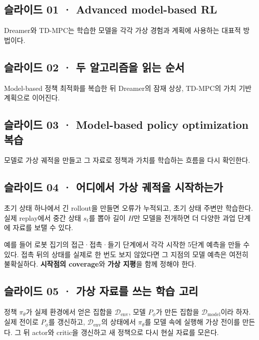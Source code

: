 \documentclass[11pt,a4paper]{article}
\begin{document}
\subsection{슬라이드 01 · Advanced model-based RL}

Dreamer와 TD-MPC는 학습한 모델을 각각 가상 경험과 계획에 사용하는 대표적 방법이다.\par

\subsection{슬라이드 02 · 두 알고리즘을 읽는 순서}

Model-based 정책 최적화를 복습한 뒤 Dreamer의 잠재 상상, TD-MPC의 가치 기반 계획으로 이어진다.\par

\subsection{슬라이드 03 · Model-based policy optimization 복습}

모델로 가상 궤적을 만들고 그 자료로 정책과 가치를 학습하는 흐름을 다시 확인한다.\par

\subsection{슬라이드 04 · 어디에서 가상 궤적을 시작하는가}

초기 상태 하나에서 긴 rollout을 만들면 오류가 누적되고, 초기 상태 주변만 학습한다. 실제 replay에서 중간 상태 $s_t$를 뽑아 길이 $H$만 모델을 전개하면 더 다양한 과업 단계에 자료를 보탤 수 있다.\par

예를 들어 로봇 집기의 접근·접촉·들기 단계에서 각각 시작한 5단계 예측을 만들 수 있다. 접촉 뒤의 상태를 실제로 한 번도 보지 않았다면 그 지점의 모델 예측은 여전히 불확실하다. \textbf{시작점의 coverage}와 \textbf{가상 지평}을 함께 정해야 한다.\par

\subsection{슬라이드 05 · 가상 자료를 쓰는 학습 고리}

정책 $\pi_\theta$가 실제 환경에서 얻은 집합을 $\mathcal D_{\mathrm{env}}$, 모델 $P_\phi$가 만든 집합을 $\mathcal D_{\mathrm{model}}$이라 하자. 실제 전이로 $P_\phi$를 갱신하고, $\mathcal D_{\mathrm{env}}$의 상태에서 $\pi_\theta$를 모델 속에 실행해 가상 전이를 만든다. 그 뒤 actor와 critic을 갱신하고 새 정책으로 다시 현실 자료를 모은다.\par
\end{document}
